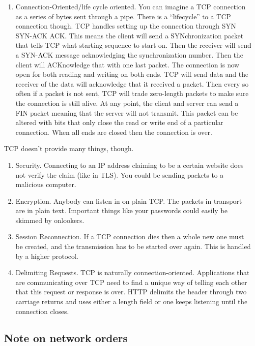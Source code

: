 \begin{enumerate}
\item Connection-Oriented/life cycle oriented.
  You can imagine a TCP connection as a series of bytes sent through a pipe.
  There is a ``lifecycle'' to a TCP connection though.
  TCP handles setting up the connection through SYN SYN-ACK ACK. This means the client will send a SYNchronization packet that tells TCP what starting sequence to start on. Then the receiver will send a SYN-ACK message acknowledging the synchronization number.
  Then the client will ACKnowledge that with one last packet.
  The connection is now open for both reading and writing on both ends.
  TCP will send data and the receiver of the data will acknowledge that it received a packet.
  Then every so often if a packet is not sent, TCP will trade zero-length packets to make sure the connection is still alive.
  At any point, the client and server can send a FIN packet meaning that the server will not transmit.
  This packet can be altered with bits that only close the read or write end of a particular connection. When all ends are closed then the connection is over.
\end{enumerate}

TCP doesn't provide many things, though.

\begin{enumerate}
\item Security.
  Connecting to an IP address claiming to be a certain website does not verify the claim (like in TLS).
  You could be sending packets to a malicious computer.
\item Encryption.
  Anybody can listen in on plain TCP.
  The packets in transport are in plain text.
  Important things like your passwords could easily be skimmed by onlookers.
\item Session Reconnection. If a TCP connection dies then a whole new one must be created, and the transmission has to be started over again.
  This is handled by a higher protocol.
\item Delimiting Requests.
  TCP is naturally connection-oriented.
  Applications that are communicating over TCP need to find a unique way of telling each other that this request or response is over.
  HTTP delimits the header through two carriage returns and uses either a length field or one keeps listening until the connection closes.
\end{enumerate}

\subsection{Note on network orders}


